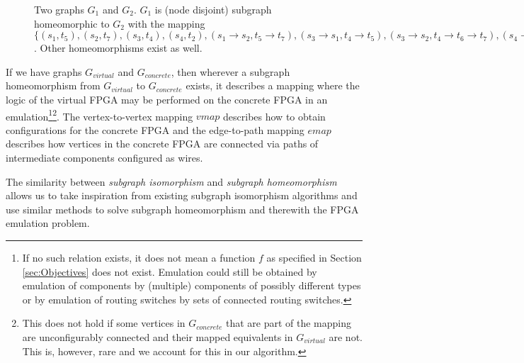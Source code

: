 \begin{figure}
\centering
\parbox{1.2in}{

}
\qquad\qquad
\begin{minipage}{1.2in}%

\end{minipage}
\caption{Two graphs $G_1$ and $G_2$. $G_1$ is (node disjoint) subgraph homeomorphic to $G_2$ with the mapping $\{(s_1, t_5), (s_2, t_7), (s_3, t_4), (s_4, t_2), (s_1 \to s_2, t_5 \to t_7), (s_3 \to s_1, t_4 \to t_5), (s_3 \to s_2, t_4 \to t_6 \to t_7), (s_4 \to s_3, t_2 \to t_3 \to t_4)\}$. Other homeomorphisms exist as well.}
\end{figure}

If we have graphs $G_{virtual}$ and $G_{concrete}$, then wherever a subgraph homeomorphism from $G_{virtual}$ to $G_{concrete}$ exists, it describes a mapping where the logic of the virtual FPGA may be performed on the concrete FPGA in an emulation\footnote{If no such relation exists, it does not mean a function $f$ as specified in Section \ref{sec:Objectives} does not exist. Emulation could still be obtained by emulation of components by (multiple) components of possibly different types or by emulation of routing switches by sets of connected routing switches.}\footnote{This does not hold if some vertices in $G_{concrete}$ that are part of the mapping are unconfigurably connected and their mapped equivalents in $G_{virtual}$ are not. This is, however, rare and we account for this in our algorithm.}. The vertex-to-vertex mapping $\mathit{vmap}$ describes how to obtain configurations for the concrete FPGA and the edge-to-path mapping $\mathit{emap}$ describes how vertices in the concrete FPGA are connected via paths of intermediate components configured as wires.


The similarity between \textit{subgraph isomorphism} and \textit{subgraph homeomorphism} allows us to take inspiration from existing subgraph isomorphism algorithms and use similar methods to solve subgraph homeomorphism and therewith the FPGA emulation problem.

